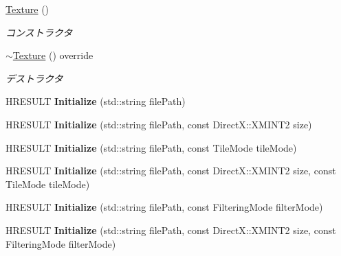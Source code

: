 \begin{DoxyCompactItemize}
\item 
\hyperlink{class_a_p_i_1_1_texture_a5c292543baec1a3caa8a4ee3f19dbeb7}{Texture} ()
\begin{DoxyCompactList}\small\item\em コンストラクタ \end{DoxyCompactList}\item 
\hyperlink{class_a_p_i_1_1_texture_aa85421a8ef676058b4fb96337be881d1}{$\sim$\+Texture} () override
\begin{DoxyCompactList}\small\item\em デストラクタ \end{DoxyCompactList}\item 
H\+R\+E\+S\+U\+LT {\bfseries Initialize} (std\+::string file\+Path)\hypertarget{class_a_p_i_1_1_texture_a97a316fc5d1e3b552e48527f9204279e}{}\label{class_a_p_i_1_1_texture_a97a316fc5d1e3b552e48527f9204279e}

\item 
H\+R\+E\+S\+U\+LT {\bfseries Initialize} (std\+::string file\+Path, const Direct\+X\+::\+X\+M\+I\+N\+T2 size)\hypertarget{class_a_p_i_1_1_texture_a821bbb88db5bfcde14bc562b60e82bde}{}\label{class_a_p_i_1_1_texture_a821bbb88db5bfcde14bc562b60e82bde}

\item 
H\+R\+E\+S\+U\+LT {\bfseries Initialize} (std\+::string file\+Path, const Tile\+Mode tile\+Mode)\hypertarget{class_a_p_i_1_1_texture_a07c4f2bb1b604fd5bdff7f0ca707bed7}{}\label{class_a_p_i_1_1_texture_a07c4f2bb1b604fd5bdff7f0ca707bed7}

\item 
H\+R\+E\+S\+U\+LT {\bfseries Initialize} (std\+::string file\+Path, const Direct\+X\+::\+X\+M\+I\+N\+T2 size, const Tile\+Mode tile\+Mode)\hypertarget{class_a_p_i_1_1_texture_a8fdf4c49a054581490c3a5058b22ea01}{}\label{class_a_p_i_1_1_texture_a8fdf4c49a054581490c3a5058b22ea01}

\item 
H\+R\+E\+S\+U\+LT {\bfseries Initialize} (std\+::string file\+Path, const Filtering\+Mode filter\+Mode)\hypertarget{class_a_p_i_1_1_texture_ad651f579e1693532dcdb2d5b0554b0a4}{}\label{class_a_p_i_1_1_texture_ad651f579e1693532dcdb2d5b0554b0a4}

\item 
H\+R\+E\+S\+U\+LT {\bfseries Initialize} (std\+::string file\+Path, const Direct\+X\+::\+X\+M\+I\+N\+T2 size, const Filtering\+Mode filter\+Mode)\hypertarget{class_a_p_i_1_1_texture_a2129e4ccc0830c8b4e74c44ef486cf5d}{}\label{class_a_p_i_1_1_texture_a2129e4ccc0830c8b4e74c44ef486cf5d}


\end{DoxyCompactItemize}
